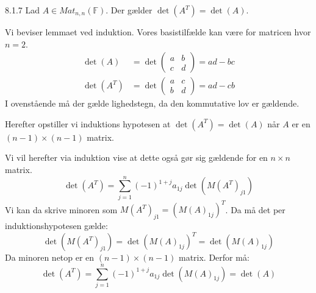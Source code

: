 \begin{lemma}{8.1.7}
	Lad $A \in Mat_{n,n}(\mathbb{F})$. Der gælder $\det(A^T) = \det(A)$.
\end{lemma}

\begin{bevis}
	Vi beviser lemmaet ved induktion. Vores basistilfælde kan være for matricen 
	hvor $n = 2$.
	\begin{align*}
		\det(A) &= \det\begin{pmatrix}
			a & b \\
			c & d
		\end{pmatrix} = ad - bc\\
		\det(A^T) &= \det\begin{pmatrix}
			a & c \\
			b & d
		\end{pmatrix} = ad - cb
	\end{align*}
	I ovenstående må der gælde lighedstegn, da den kommutative lov er gældende.
	
	\noindent Herefter opstiller vi induktions hypotesen at $\det(A^T) = 
	\det(A)$ når $A$ er en $(n-1) \times (n-1)$ matrix.
	
	\noindent Vi vil herefter via induktion vise at dette også gør sig gældende
	for en $n \times n$ matrix.
	\[
		\det(A^T) = \sum_{j=1}^{n}(-1)^{1+j}a_{1j}\det(M(A^T)_{j1})
	\]
	Vi kan da skrive minoren som $M(A^T)_{j1} = (M(A)_{1j})^T$. Da må det per 
	induktionshypotesen gælde:
	\[
		\det(M(A^T)_{j1}) = \det(M(A)_{1j})^T = \det(M(A)_{1j})
	\]
	Da minoren netop er en $(n-1) \times (n-1)$ matrix. Derfor må:
	\[
		\det(A^T) = \sum_{j=1}^{n}(-1)^{1+j}a_{1j}\det(M(A)_{1j}) = \det(A)
	\]
\end{bevis}
